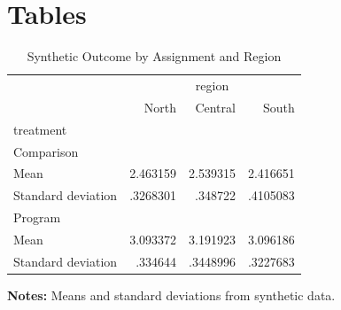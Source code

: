 \documentclass{article}
\begin{document}
\section{Tables}
\begin{table}[htbp] 
\centering 
\begin{threeparttable} 
\caption{Synthetic Outcome by Assignment and Region} 

\centering
\begin{tabular}{llll}
\toprule
\multicolumn{1}{c}{} &
  \multicolumn{3}{c}{region} \\
\multicolumn{1}{c}{} &
  \multicolumn{1}{r}{North} &
  \multicolumn{1}{r}{Central} &
  \multicolumn{1}{r}{South} \\
\midrule
\multicolumn{1}{l}{treatment} &
  \multicolumn{1}{r}{} &
  \multicolumn{1}{r}{} &
  \multicolumn{1}{r}{} \\
\multicolumn{1}{l}{\hspace{1em}Comparison} &
  \multicolumn{1}{r}{} &
  \multicolumn{1}{r}{} &
  \multicolumn{1}{r}{} \\
\multicolumn{1}{l}{\hspace{2em}Mean} &
  \multicolumn{1}{r}{2.463159} &
  \multicolumn{1}{r}{2.539315} &
  \multicolumn{1}{r}{2.416651} \\
\multicolumn{1}{l}{\hspace{2em}Standard deviation} &
  \multicolumn{1}{r}{.3268301} &
  \multicolumn{1}{r}{.348722} &
  \multicolumn{1}{r}{.4105083} \\
\multicolumn{1}{l}{\hspace{1em}Program} &
  \multicolumn{1}{r}{} &
  \multicolumn{1}{r}{} &
  \multicolumn{1}{r}{} \\
\multicolumn{1}{l}{\hspace{2em}Mean} &
  \multicolumn{1}{r}{3.093372} &
  \multicolumn{1}{r}{3.191923} &
  \multicolumn{1}{r}{3.096186} \\
\multicolumn{1}{l}{\hspace{2em}Standard deviation} &
  \multicolumn{1}{r}{.334644} &
  \multicolumn{1}{r}{.3448996} &
  \multicolumn{1}{r}{.3227683} \\
\bottomrule
\end{tabular}

 \footnotesize  
\textbf{Notes:} Means and standard deviations from synthetic data. 
\end{threeparttable} 
\end{table}
\end{document}
